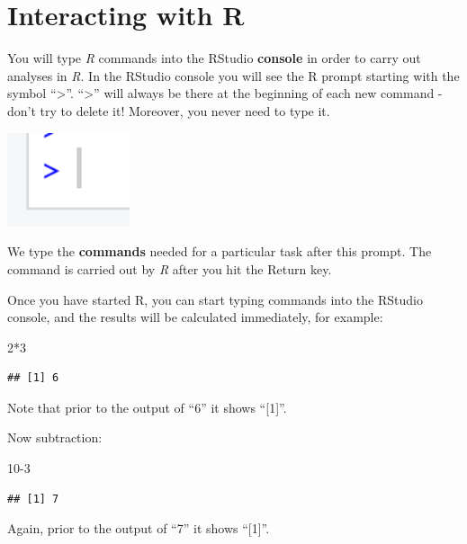 \documentclass[
]{book}
\newenvironment{Shaded}{\begin{snugshade}}{\end{snugshade}}
\newcommand{\DecValTok}[1]{\textcolor[rgb]{0.00,0.00,0.81}{#1}}
\newcommand{\SpecialCharTok}[1]{\textcolor[rgb]{0.00,0.00,0.00}{#1}}
\begin{document}
\hypertarget{interacting-with-r}{%
\section{Interacting with R}\label{interacting-with-r}}

You will type \emph{R} commands into the RStudio \textbf{console} in order to carry out analyses in \emph{R}. In the RStudio console you will see the R prompt starting with the symbol ``\textgreater{}''. ``\textgreater{}'' will always be there at the beginning of each new command - don't try to delete it! Moreover, you never need to type it.

\includegraphics[width=1.42in]{images/R_cursor}

We type the \textbf{commands} needed for a particular task after this prompt. The command is carried out by \emph{R} after you hit the Return key.

Once you have started R, you can start typing commands into the RStudio console, and the results will be calculated immediately, for example:

\begin{Shaded}
\begin{Highlighting}[]
\DecValTok{2}\SpecialCharTok{*}\DecValTok{3}
\end{Highlighting}
\end{Shaded}

\begin{verbatim}
## [1] 6
\end{verbatim}

Note that prior to the output of ``6'' it shows ``{[}1{]}''.

Now subtraction:

\begin{Shaded}
\begin{Highlighting}[]
\DecValTok{10{-}3}
\end{Highlighting}
\end{Shaded}

\begin{verbatim}
## [1] 7
\end{verbatim}

Again, prior to the output of ``7'' it shows ``{[}1{]}''.
\end{document}

